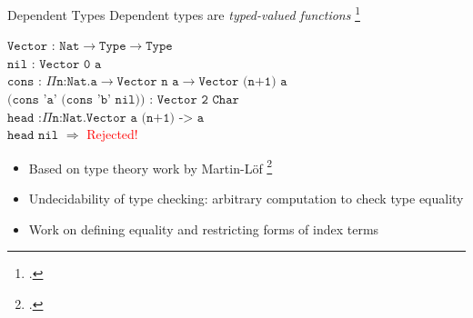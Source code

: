 \documentclass[aspectratio=169]{beamer}
\begin{document}
\begin{frame}{Dependent Types}
    Dependent types are \emph{typed-valued functions} \footcite{pierce_advanced_2005}
\pause
\begin{center}
   $\texttt{Vector : Nat}\rightarrow\texttt{Type}\rightarrow\texttt{Type}$
   \pause
   \\
   $\texttt{nil : Vector 0 a}$
   \\
   \pause
   $\texttt{cons : }\Pi\texttt{n:Nat.a}\rightarrow\texttt{Vector n a}\rightarrow\texttt{Vector (n+1) a}$
   \\
   \pause
   $\texttt{(cons 'a' (cons 'b' nil)) : Vector 2 Char}$
   \\
   \pause
   $\texttt{head :}\Pi\texttt{n:Nat.Vector a (n+1) -> a}$
   \\
   \pause
   $\texttt{head nil}$ \pause $\Rightarrow$ \textcolor{red}{Rejected!}
\end{center}
    \pause
    \begin{itemize}
        \item Based on type theory work by Martin-L{\"o}f \footcite{martin-lof_constructive_1984}
        \item Undecidability of type checking: arbitrary computation to check type equality
        \item Work on defining equality and restricting forms of index terms
    \end{itemize}
    \vspace{0.1in}
\end{frame}
\end{document}
